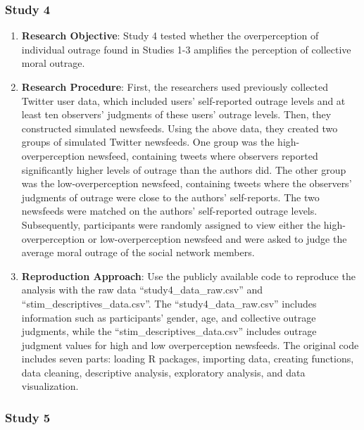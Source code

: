 \documentclass[
  man]{apa6}
\providecommand{\tightlist}{%
  \setlength{\itemsep}{0pt}\setlength{\parskip}{0pt}}
\begin{document}
\hypertarget{study-4}{%
\subsubsection{Study 4}\label{study-4}}

\begin{enumerate}
\def\labelenumi{\arabic{enumi}.}
\tightlist
\item
  \textbf{Research Objective}:
  Study 4 tested whether the overperception of individual outrage found in Studies 1-3 amplifies the perception of collective moral outrage.
\item
  \textbf{Research Procedure}:
  First, the researchers used previously collected Twitter user data, which included users' self-reported outrage levels and at least ten observers' judgments of these users' outrage levels. Then, they constructed simulated newsfeeds. Using the above data, they created two groups of simulated Twitter newsfeeds. One group was the high-overperception newsfeed, containing tweets where observers reported significantly higher levels of outrage than the authors did. The other group was the low-overperception newsfeed, containing tweets where the observers' judgments of outrage were close to the authors' self-reports. The two newsfeeds were matched on the authors' self-reported outrage levels. Subsequently, participants were randomly assigned to view either the high-overperception or low-overperception newsfeed and were asked to judge the average moral outrage of the social network members.
\item
  \textbf{Reproduction Approach}:
  Use the publicly available code to reproduce the analysis with the raw data ``study4\_data\_raw.csv'' and ``stim\_descriptives\_data.csv''. The ``study4\_data\_raw.csv'' includes information such as participants' gender, age, and collective outrage judgments, while the ``stim\_descriptives\_data.csv'' includes outrage judgment values for high and low overperception newsfeeds. The original code includes seven parts: loading R packages, importing data, creating functions, data cleaning, descriptive analysis, exploratory analysis, and data visualization.
\end{enumerate}

\hypertarget{study-5}{%
\subsubsection{Study 5}\label{study-5}}
\end{document}
